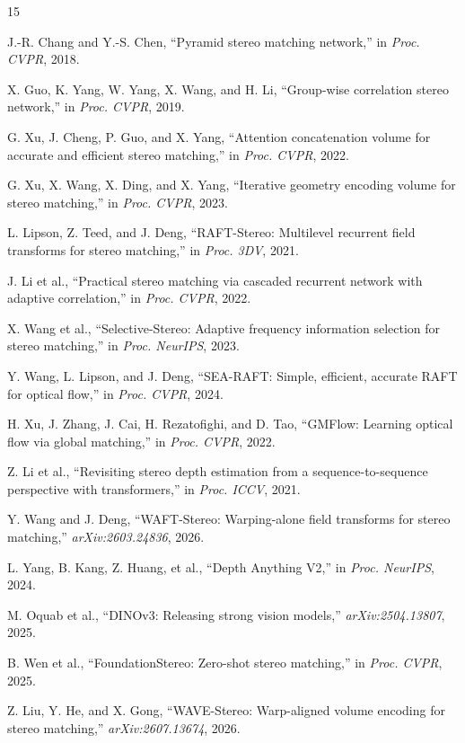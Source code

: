 \documentclass[conference]{IEEEtran}
\begin{document}
\begin{thebibliography}{15}

J.-R. Chang and Y.-S. Chen, ``Pyramid stereo matching network,'' in \emph{Proc. CVPR}, 2018.

X. Guo, K. Yang, W. Yang, X. Wang, and H. Li, ``Group-wise correlation stereo network,'' in \emph{Proc. CVPR}, 2019.

G. Xu, J. Cheng, P. Guo, and X. Yang, ``Attention concatenation volume for accurate and efficient stereo matching,'' in \emph{Proc. CVPR}, 2022.

G. Xu, X. Wang, X. Ding, and X. Yang, ``Iterative geometry encoding volume for stereo matching,'' in \emph{Proc. CVPR}, 2023.

L. Lipson, Z. Teed, and J. Deng, ``RAFT-Stereo: Multilevel recurrent field transforms for stereo matching,'' in \emph{Proc. 3DV}, 2021.

J. Li et al., ``Practical stereo matching via cascaded recurrent network with adaptive correlation,'' in \emph{Proc. CVPR}, 2022.

X. Wang et al., ``Selective-Stereo: Adaptive frequency information selection for stereo matching,'' in \emph{Proc. NeurIPS}, 2023.

Y. Wang, L. Lipson, and J. Deng, ``SEA-RAFT: Simple, efficient, accurate RAFT for optical flow,'' in \emph{Proc. CVPR}, 2024.

H. Xu, J. Zhang, J. Cai, H. Rezatofighi, and D. Tao, ``GMFlow: Learning optical flow via global matching,'' in \emph{Proc. CVPR}, 2022.

Z. Li et al., ``Revisiting stereo depth estimation from a sequence-to-sequence perspective with transformers,'' in \emph{Proc. ICCV}, 2021.

Y. Wang and J. Deng, ``WAFT-Stereo: Warping-alone field transforms for stereo matching,'' \emph{arXiv:2603.24836}, 2026.

L. Yang, B. Kang, Z. Huang, et al., ``Depth Anything V2,'' in \emph{Proc. NeurIPS}, 2024.

M. Oquab et al., ``DINOv3: Releasing strong vision models,'' \emph{arXiv:2504.13807}, 2025.

B. Wen et al., ``FoundationStereo: Zero-shot stereo matching,'' in \emph{Proc. CVPR}, 2025.

Z. Liu, Y. He, and X. Gong, ``WAVE-Stereo: Warp-aligned volume encoding for stereo matching,'' \emph{arXiv:2607.13674}, 2026.

\end{thebibliography}
\end{document}
